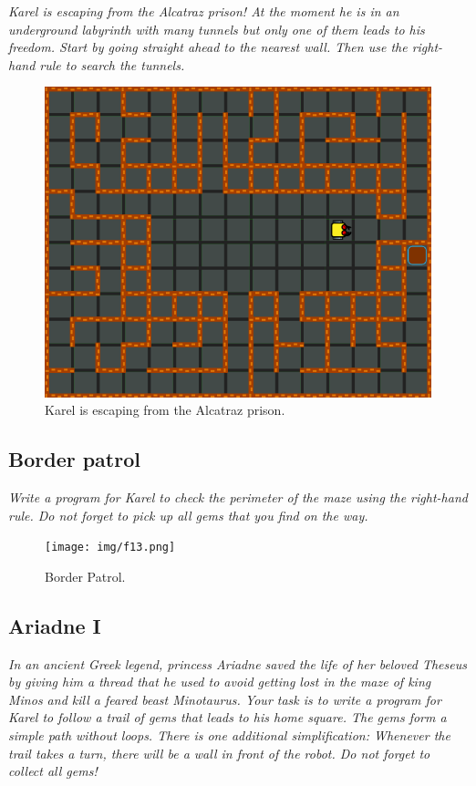 {\em Karel is escaping from the Alcatraz prison! At the moment he is in an underground labyrinth with many tunnels but only one of them leads to his freedom. Start by going straight ahead to the nearest wall. Then use the right-hand rule to search the tunnels.}\\[-7mm]

\begin{figure}[!ht]
\begin{center}
\includegraphics[height=0.4\textwidth]{img/f12.png}
\end{center}
\vspace{-4mm}
\caption{Karel is escaping from the Alcatraz prison.}
\label{fig:f12}
\vspace{-1cm}
\end{figure}
\newpage


\subsection{Border patrol}

{\em Write a program for Karel to check the perimeter of the maze using the 
right-hand rule. Do not forget to pick up all gems that you find on the way.}

\begin{figure}[!ht]
\begin{center}
\texttt{[image: img/f13.png]}
\end{center}
\vspace{-4mm}
\caption{Border Patrol.}
\label{fig:f13}
\vspace{-1cm}
\end{figure}



\subsection{Ariadne I}

{\em In an ancient Greek legend, princess Ariadne saved the life of her beloved Theseus by giving him a thread that he used to avoid getting lost in the maze of king Minos and kill a feared beast Minotaurus. Your task is to write a program for Karel to follow a trail of gems that leads to his home square. The gems form a simple path without loops. There is one additional simplification: Whenever the trail takes a turn, there will be a wall in front of the robot. Do not forget to collect all gems!}
\newpage


